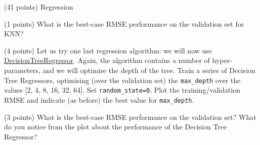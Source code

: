 \documentclass[12pt]{article}
\begin{document}
\begin{question}{\label{Q_LR_BA}(41 points) Regression}
\begin{subquestion}{(1 points) What is the best-case RMSE performance on the validation set for KNN?}



\end{subquestion}

\begin{subquestion}{(4 points) Let us try one last regression algorithm: we will now use \href{https://scikit-learn.org/stable/modules/generated/sklearn.tree.DecisionTreeRegressor.html}{DecisionTreeRegressor}. Again, the algorithm contains a number of hyper-parameters, and we will optimise the depth of the tree. Train a series of Decision Tree Regressors, optimising (over the validation set) the \texttt{max\_depth} over the values [2, 4, 8, 16, 32, 64]. Set \texttt{random\_state=0}. Plot the training/validation RMSE and indicate (as before) the best value for \texttt{max\_depth}.}






\end{subquestion}

\begin{subquestion}{(3 points) What is the best-case RMSE performance on the validation set? What do you notice from the plot about the performance of the Decision Tree Regressor?}




\end{subquestion}
\end{question}
\end{document}
